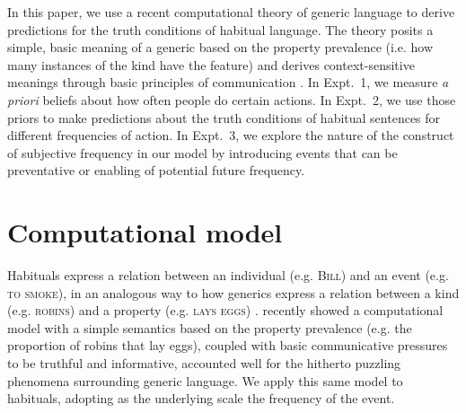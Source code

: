 \documentclass[10pt,letterpaper]{article}
\begin{document}
In this paper, we use a recent computational theory of generic language to derive predictions for the truth conditions of habitual language. 
The theory posits a simple, basic meaning of a generic based on the property prevalence (i.e. how many instances of the kind have the feature) and derives context-sensitive meanings through basic principles of communication \cite{TesslerUnderReview}.
In Expt.~1, we measure \emph{a priori} beliefs about how often people do certain actions.
In Expt.~2, we use those priors to make predictions about the truth conditions of habitual sentences for different frequencies of action. 
In Expt.~3, we explore the nature of the construct of subjective frequency in our model by introducing events that can be preventative or enabling of potential future frequency. 

\section{Computational model}

Habituals express a relation between an individual (e.g. \textsc{Bill}) and an event (e.g. \textsc{to smoke}), in an analogous way to how generics express a relation between a kind (e.g. \textsc{robins}) and a property (e.g. \textsc{lays eggs}) \cite{Carlson1995}. 
 recently showed a computational model with a simple semantics based on the property prevalence (e.g. the proportion of robins that lay eggs), coupled with basic communicative pressures to be truthful and informative, accounted well for the hitherto puzzling phenomena surrounding generic language.
We apply this same model to habituals, adopting as the underlying scale the frequency of the event.
 
\end{document}
